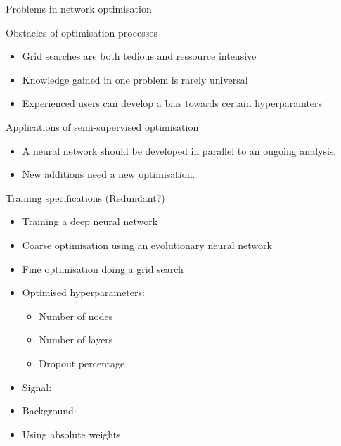 \begin{frame}{Problems in network optimisation}
    \begin{block}{Obstacles of optimisation processes}
        \begin{itemize}
            \item Grid searches are both tedious and ressource intensive
            \item Knowledge gained in one problem is rarely universal
            \item Experienced users can develop a bias towards certain hyperparamters
        \end{itemize}
    \end{block}
    \begin{block}{Applications of semi-supervised optimisation}
        \begin{itemize}
            \item A neural network should be developed in parallel to an ongoing analysis.
            \item New additions need a new optimisation.
        \end{itemize}
    \end{block}
\end{frame}

\begin{frame}{Training specifications (Redundant?) }
  \begin{itemize}
      \item Training a deep neural network
      \vspace{0.2cm}
      \item Coarse optimisation using an evolutionary neural network
      \vspace{0.2cm}
      \item Fine optimisation doing a grid search
      \vspace{0.2cm}
      \item Optimised hyperparameters:
          \begin{itemize}
              \item Number of nodes
              \item Number of layers
              \item Dropout percentage
          \end{itemize}
      \item Signal: \tHq
      \item Background: \ttbar
      \item Using absolute weights
  \end{itemize}
\end{frame}

